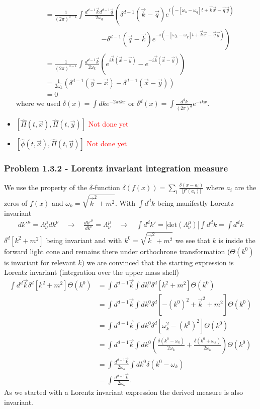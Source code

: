 \documentclass[10pt,a4paper]{book}
\theoremstyle{definition}
\begin{document}
\begin{itemize}
\begin{align}
    &= \frac{1}{(2\pi)^{d-1}}\int \frac{d^{d-1}\vec{k}d^{d-1}\vec{q}}{2 \omega_q}\left(\delta^{d-1}(\vec{k}-\vec{q})e^{i(-[\omega_k-\omega_q]t+\vec{k}\vec{x}-\vec{q}\vec{y})}\right.\\
    &\qquad\qquad\qquad\qquad\left.-\delta^{d-1}(\vec{q}-\vec{k})e^{-i(-[\omega_k-\omega_q]t+\vec{k}\vec{x}-\vec{q}\vec{y})}\right)\\
    &= \frac{1}{(2\pi)^{d-1}}\int \frac{d^{d-1}\vec{k}}{2 \omega_k}\left(e^{i\vec{k}(\vec{x}-\vec{y})}-e^{-i\vec{k}(\vec{x}-\vec{y})}\right)\\
    &= \frac{1}{2 \omega_k}\left( \delta^{d-1}(\vec{y}-\vec{x})-\delta^{d-1}(\vec{x}-\vec{y})\right)\\
    &=0
\end{align}
where we used $\delta(x)=\int dk e^{-2\pi i kx}$ or $\delta^d(x)=\int \frac{d^dk}{(2\pi)^d} e^{-ikx}$.

\item $[\hat\Pi(t,\vec{x}),\hat\Pi(t,\vec{y})]$
\textcolor{red}{Not done yet}
\item $[\hat\phi(t,\vec{x}),\hat\Pi(t,\vec{y})]$
\textcolor{red}{Not done yet}
\end{itemize}

\subsubsection{Problem 1.3.2 - Lorentz invariant integration measure}
We use the property of the $\delta$-function $\delta(f(x))=\sum_i\frac{\delta(x-a_i)}{]f'(a_i)|}$ where ${a_i}$ are the zeros of $f(x)$ and $\omega_k=\sqrt{\vec{k}^2+m^2}$. With $\int d^dk$ being manifestly Lorentz invariant 
\begin{align}
    dk'^\mu = \Lambda^\mu_\nu dk^\nu\quad\rightarrow\quad \frac{dk'^\mu}{dk^\nu}=\Lambda^\mu_\nu\quad\rightarrow\quad\int d^d k'=|\text{det}(\Lambda^\mu_\nu)|\int d^dk=\int d^dk
\end{align}
$\delta^d[k^2+m^2]$ being invariant and with $k^0=\sqrt{\vec{k}^2+m^2}$ we see that $k$ is inside the forward light cone and remains there under orthochrone transformation ($\Theta(k^0)$ is invariant for relevant $k$) we are convinced that the starting expression is Lorentz invariant (integration over the upper mass shell)
\begin{align}
    \int d^{d}\vec{k} \delta^d[k^2+m^2]\Theta(k^0) &=\int d^{d-1}\vec{k}\int dk^0\delta^d[k^2+m^2]\Theta(k^0)\\
    &=\int d^{d-1}\vec{k}\int dk^0\delta^d[-(k^0)^2+\vec{k}^2+m^2]\Theta(k^0)\\
    &=\int d^{d-1}\vec{k}\int dk^0\delta^d[\omega_k^2-(k^0)^2]\Theta(k^0)\\
    &=\int d^{d-1}\vec{k}\int dk^0\left( \frac{\delta(k^0-\omega_k)}{2\omega_k}+\frac{\delta(k^0+\omega_k)}{2\omega_k} \right)\Theta(k^0)\\
    &=\int \frac{d^{d-1}\vec{k}}{2\omega_k}\int dk^0\delta(k^0-\omega_k)\\
    &=\int\frac{d^{d-1}\vec{k}}{2\omega_k}.
\end{align}
As we started with a Lorentz invariant expression the derived measure is also invariant.
\end{document}
